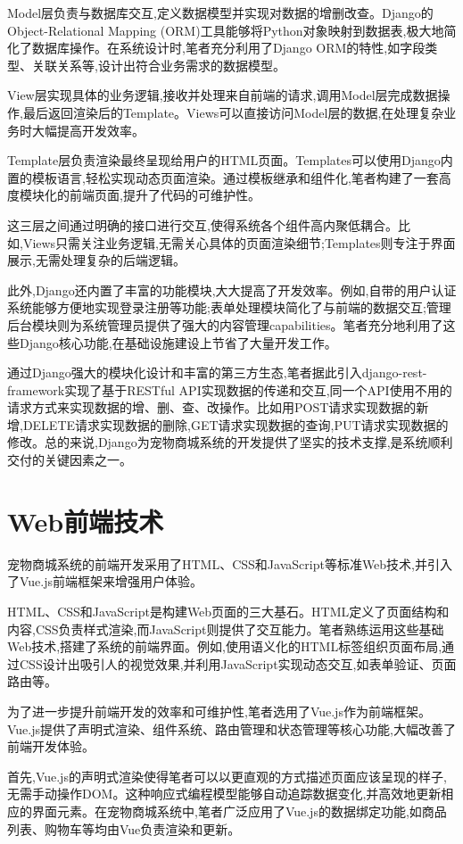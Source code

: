 Model层负责与数据库交互,定义数据模型并实现对数据的增删改查。Django的Object-Relational Mapping (ORM)工具能够将Python对象映射到数据表,极大地简化了数据库操作。在系统设计时,笔者充分利用了Django ORM的特性,如字段类型、关联关系等,设计出符合业务需求的数据模型。

View层实现具体的业务逻辑,接收并处理来自前端的请求,调用Model层完成数据操作,最后返回渲染后的Template。Views可以直接访问Model层的数据,在处理复杂业务时大幅提高开发效率。

Template层负责渲染最终呈现给用户的HTML页面。Templates可以使用Django内置的模板语言,轻松实现动态页面渲染。通过模板继承和组件化,笔者构建了一套高度模块化的前端页面,提升了代码的可维护性。

这三层之间通过明确的接口进行交互,使得系统各个组件高内聚低耦合。比如,Views只需关注业务逻辑,无需关心具体的页面渲染细节;Templates则专注于界面展示,无需处理复杂的后端逻辑。

此外,Django还内置了丰富的功能模块,大大提高了开发效率。例如,自带的用户认证系统能够方便地实现登录注册等功能;表单处理模块简化了与前端的数据交互;管理后台模块则为系统管理员提供了强大的内容管理capabilities。笔者充分地利用了这些Django核心功能,在基础设施建设上节省了大量开发工作。

通过Django强大的模块化设计和丰富的第三方生态,笔者据此引入django-rest-framework实现了基于RESTful API实现数据的传递和交互,同一个API使用不用的请求方式来实现数据的增、删、查、改操作。比如用POST请求实现数据的新增,DELETE请求实现数据的删除,GET请求实现数据的查询,PUT请求实现数据的修改。总的来说,Django为宠物商城系统的开发提供了坚实的技术支撑,是系统顺利交付的关键因素之一。

\section{Web前端技术}
宠物商城系统的前端开发采用了HTML、CSS和JavaScript等标准Web技术,并引入了Vue.js前端框架来增强用户体验。

HTML、CSS和JavaScript是构建Web页面的三大基石。HTML定义了页面结构和内容,CSS负责样式渲染,而JavaScript则提供了交互能力。笔者熟练运用这些基础Web技术,搭建了系统的前端界面。例如,使用语义化的HTML标签组织页面布局,通过CSS设计出吸引人的视觉效果,并利用JavaScript实现动态交互,如表单验证、页面路由等。

为了进一步提升前端开发的效率和可维护性,笔者选用了Vue.js作为前端框架。Vue.js提供了声明式渲染、组件系统、路由管理和状态管理等核心功能,大幅改善了前端开发体验。

首先,Vue.js的声明式渲染使得笔者可以以更直观的方式描述页面应该呈现的样子,无需手动操作DOM。这种响应式编程模型能够自动追踪数据变化,并高效地更新相应的界面元素。在宠物商城系统中,笔者广泛应用了Vue.js的数据绑定功能,如商品列表、购物车等均由Vue负责渲染和更新。

